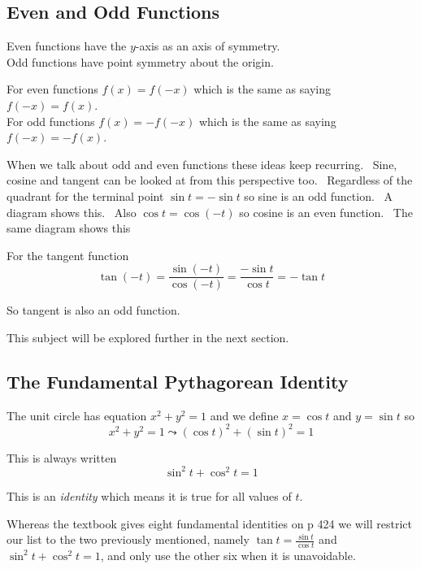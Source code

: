 \subsection{Even and Odd Functions}
Even functions have the $y$-axis as an axis of symmetry. \\\relax Odd functions have point symmetry about
the origin. 

For even functions $f (x) =f ( -x)$ which is the same as saying $f ( -x) =f (x)$. \\\relax For odd functions $f (x) = -f ( -x)$ which is the same as saying $f ( -x) = -f (x)$. 

When we talk about odd and even functions these ideas keep recurring. \ Sine,
cosine and tangent can be looked at from this perspective too. \ Regardless of the quadrant for the terminal point
$\sin  t = -\sin  t$ so sine is an odd function. \ A diagram shows this. \ Also
$\cos  t =\cos  ( -t)$ so cosine is an even function. \ The same diagram shows this 

For the
tangent function
\begin{equation*}\tan  ( -t) =\frac{\sin  ( -t)}{\cos  ( -t)} =\frac{ -\sin  t}{\cos  t} = -\tan  t
\end{equation*}

So tangent is also an odd function. 

This subject will be explored further in
the next section. 

\subsection{The Fundamental Pythagorean Identity}
The unit circle has equation $x^{2} +y^{2} =1$ and we define $x =\cos  t$ and $y =\sin  t$ so
\begin{equation*}x^{2} +y^{2} =1 \leadsto \left (\cos  t\right )^{2} +\left (\sin  t\right )^{2} =1
\end{equation*}

This is always written
\begin{equation*}\sin ^{2} t +\cos ^{2} t =1
\end{equation*}

This is an \emph{identity} which means it is true for all values of $t$. 

Whereas the textbook gives eight fundamental identities on p 424 we will restrict our list to the two
previously mentioned, namely $\tan  t =\frac{\sin  t}{\cos  t}$ and $\sin ^{2} t +\cos ^{2} t =1$, and only use the other six when it is unavoidable. 

